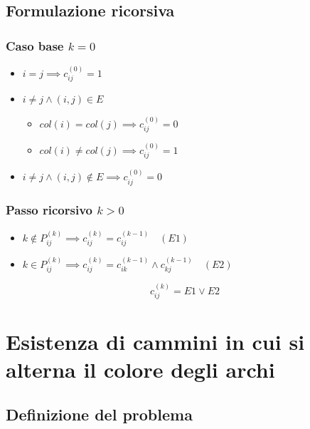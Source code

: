 \subsection{Formulazione ricorsiva}

\subsubsection{Caso base $k=0$}
\begin{itemize}
    \item $i = j \implies c_{ij}^{(0)} = 1$

    \item $i \not = j \land (i,j) \in E$
    \begin{itemize}
        \item $col(i) = col(j) \implies c_{ij}^{(0)} = 0$ 
        \item $col(i) \not = col(j) \implies c_{ij}^{(0)} = 1$
    \end{itemize}

    \item $i \not = j \land (i,j) \not \in E \implies c_{ij}^{(0)} = 0$
\end{itemize}

\subsubsection{Passo ricorsivo $k>0$}
\begin{itemize}
    \item $k \not \in P_{ij}^{(k)} \implies c_{ij}^{(k)} = c_{ij}^{(k-1)} \quad (E1)$
    \item $k \in P_{ij}^{(k)} \implies c_{ij}^{(k)} = c_{ik}^{(k-1)} \land c_{kj}^{(k-1)} \quad (E2)$
\end{itemize}

{
    \large

    $$
        c_{ij}^{(k)} = E1 \lor E2
    $$
}

\newpage
\section{Esistenza di cammini in cui si alterna il colore degli archi}

\subsection{Definizione del problema}


